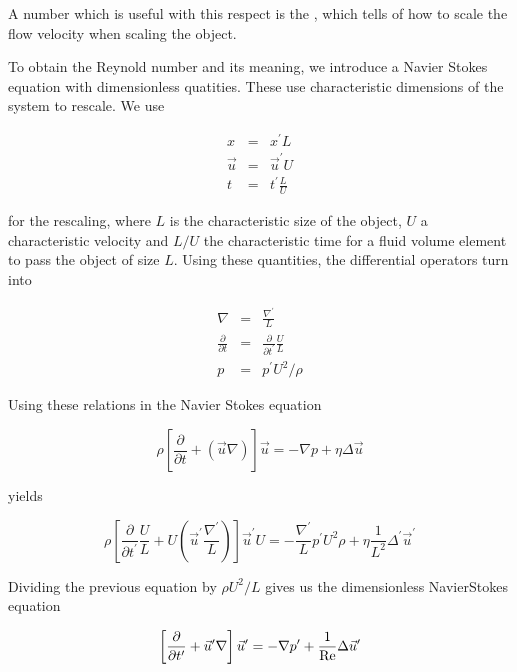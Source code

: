 \documentclass[letterpaper,10pt,english]{sphinxmanual}
\begin{document}
\sphinxAtStartPar
A number which is useful with this respect is the , which tells of how to scale the flow velocity when scaling the object.

\sphinxAtStartPar
To obtain the Reynold number and its meaning, we introduce a Navier Stokes equation with dimensionless quatities. These use characteristic dimensions of the system to rescale. We use

\sphinxAtStartPar
\begin{eqnarray}
x&=&x^{\prime} L\\
\vec{u}&=&\vec{u}^{\prime} U\\
t&=&t^{\prime} \frac{L}{U}
\end{eqnarray}

\sphinxAtStartPar
for the rescaling, where \(L\) is the characteristic size of the object, \(U\) a characteristic velocity and \(L/U\) the characteristic time for a fluid volume element to pass the object of size \(L\). Using these quantities, the differential operators turn into

\sphinxAtStartPar
\begin{eqnarray}
\nabla &=& \frac{\nabla^{\prime}}{L}\\
\frac{\partial}{\partial t} &=& \frac{\partial}{\partial t^{\prime}}\frac{U}{L}\\
p&=&p^{\prime} U^2/\rho
\end{eqnarray}

\sphinxAtStartPar
Using these relations in the Navier Stokes equation

\sphinxAtStartPar
\begin{equation}
\rho \left [ \frac{\partial }{\partial t} +(\vec{u}\nabla)\right]\vec{u}=-\nabla p +\eta \Delta \vec{u}
\end{equation}

\sphinxAtStartPar
yields

\sphinxAtStartPar
\begin{equation}
\rho \left [ \frac{\partial }{\partial t^{\prime}}\frac{U}{L} +U\left (\vec{u}^{\prime}\frac{\nabla^{\prime}}{L}\right)\right]\vec{u}^{\prime}U=-\frac{\nabla^{\prime}}{L}p^{\prime} U^2 \rho +\eta \frac{1}{L^2}\Delta^{\prime} \vec{u}^{\prime}
\end{equation}

\sphinxAtStartPar
Dividing the previous equation by \(\rho U^2/L\) gives us the dimensionless Navier\sphinxhyphen{}Stokes equation

\sphinxAtStartPar
\begin{equation}
\left [\frac{\partial }{\partial t^{\prime}} +\vec{u}^{\prime} \nabla \right ]\vec{u}^{\prime}=-\nabla p^{\prime} +\frac{1}{\rm Re}\Delta \vec{u}^{\prime}
\end{equation}
\end{document}
